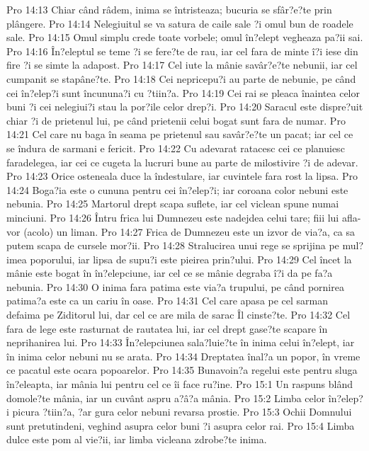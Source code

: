 Pro 14:13  Chiar când râdem, inima se întristeaza; bucuria se sfâr?e?te prin plângere.
Pro 14:14  Nelegiuitul se va satura de caile sale ?i omul bun de roadele sale.
Pro 14:15  Omul simplu crede toate vorbele; omul în?elept vegheaza pa?ii sai.
Pro 14:16  În?eleptul se teme ?i se fere?te de rau, iar cel fara de minte î?i iese din fire ?i se simte la adapost.
Pro 14:17  Cel iute la mânie savâr?e?te nebunii, iar cel cumpanit se stapâne?te.
Pro 14:18  Cei nepricepu?i au parte de nebunie, pe când cei în?elep?i sunt încununa?i cu ?tiin?a.
Pro 14:19  Cei rai se pleaca înaintea celor buni ?i cei nelegiui?i stau la por?ile celor drep?i.
Pro 14:20  Saracul este dispre?uit chiar ?i de prietenul lui, pe când prietenii celui bogat sunt fara de numar.
Pro 14:21  Cel care nu baga în seama pe prietenul sau savâr?e?te un pacat; iar cel ce se îndura de sarmani e fericit.
Pro 14:22  Cu adevarat ratacesc cei ce planuiesc faradelegea, iar cei ce cugeta la lucruri bune au parte de milostivire ?i de adevar.
Pro 14:23  Orice osteneala duce la îndestulare, iar cuvintele fara rost la lipsa.
Pro 14:24  Boga?ia este o cununa pentru cei în?elep?i; iar coroana color nebuni este nebunia.
Pro 14:25  Martorul drept scapa suflete, iar cel viclean spune numai minciuni.
Pro 14:26  Întru frica lui Dumnezeu este nadejdea celui tare; fiii lui afla-vor (acolo) un liman.
Pro 14:27  Frica de Dumnezeu este un izvor de via?a, ca sa putem scapa de cursele mor?ii.
Pro 14:28  Stralucirea unui rege se sprijina pe mul?imea poporului, iar lipsa de supu?i este pieirea prin?ului.
Pro 14:29  Cel încet la mânie este bogat în în?elepciune, iar cel ce se mânie degraba î?i da pe fa?a nebunia.
Pro 14:30  O inima fara patima este via?a trupului, pe când pornirea patima?a este ca un cariu în oase.
Pro 14:31  Cel care apasa pe cel sarman defaima pe Ziditorul lui, dar cel ce are mila de sarac Îl cinste?te.
Pro 14:32  Cel fara de lege este rasturnat de rautatea lui, iar cel drept gase?te scapare în neprihanirea lui.
Pro 14:33  În?elepciunea sala?luie?te în inima celui în?elept, iar în inima celor nebuni nu se arata.
Pro 14:34  Dreptatea înal?a un popor, în vreme ce pacatul este ocara popoarelor.
Pro 14:35  Bunavoin?a regelui este pentru sluga în?eleapta, iar mânia lui pentru cel ce îi face ru?ine.
Pro 15:1  Un raspuns blând domole?te mânia, iar un cuvânt aspru a?â?a mânia.
Pro 15:2  Limba celor în?elep?i picura ?tiin?a, ?ar gura celor nebuni revarsa prostie.
Pro 15:3  Ochii Domnului sunt pretutindeni, veghind asupra celor buni ?i asupra celor rai.
Pro 15:4  Limba dulce este pom al vie?ii, iar limba vicleana zdrobe?te inima.
